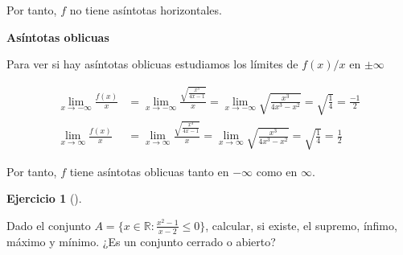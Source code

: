 \documentclass[
  spanish,
  a4paper,
]{scrreport}
\theoremstyle{definition}
\newtheorem{exercise}{Ejercicio}[chapter]
\theoremstyle{remark}
\begin{document}
\begin{tcolorbox}
Por tanto, \(f\) no tiene asíntotas horizontales.

\textbf{Asíntotas oblicuas}

Para ver si hay asíntotas oblicuas estudiamos los límites de \(f(x)/x\)
en \(\pm\infty\)

\begin{align*}
\lim_{x\to-\infty}\frac{f(x)}{x} &=  \lim_{x\to-\infty} \frac{\sqrt{\frac{x^3}{4x-1}}}{x} = \lim_{x\to-\infty} \sqrt{\frac{x^3}{4x^3-x^2}} = \sqrt{\frac{1}{4}} = \frac{-1}{2}\\
\lim_{x\to\infty}\frac{f(x)}{x} &=  \lim_{x\to\infty} \frac{\sqrt{\frac{x^3}{4x-1}}}{x} = \lim_{x\to\infty} \sqrt{\frac{x^3}{4x^3-x^2}} = \sqrt{\frac{1}{4}} = \frac{1}{2}
\end{align*}

Por tanto, \(f\) tiene asíntotas oblicuas tanto en \(-\infty\) como en
\(\infty\).

\end{tcolorbox}

\begin{exercise}[]\protect\hypertarget{exr-5}{}\label{exr-5}

Dado el conjunto \(A=\{x\in\mathbb{R} : \frac{x^2-1}{x-2}\leq 0\}\),
calcular, si existe, el supremo, ínfimo, máximo y mínimo. ¿Es un
conjunto cerrado o abierto?

\end{exercise}
\end{document}
